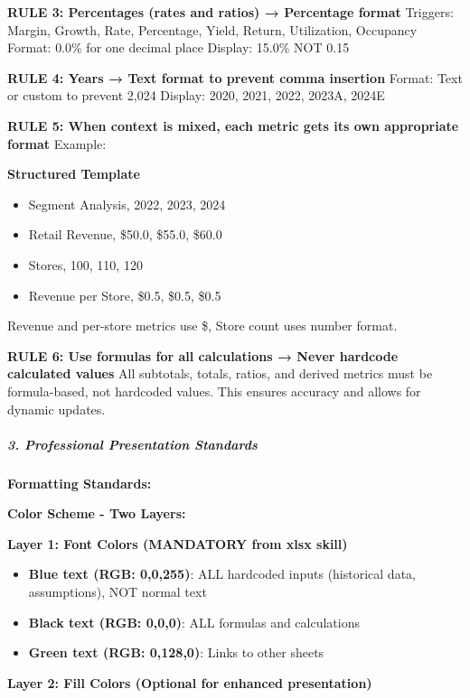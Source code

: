 \documentclass[11pt]{article}
\begin{document}
\textbf{RULE 3: Percentages (rates and ratios) → Percentage format} Triggers: Margin, Growth, Rate, Percentage, Yield, Return, Utilization, Occupancy Format: 0.0\% for one decimal place Display: 15.0\% NOT 0.15


\textbf{RULE 4: Years → Text format to prevent comma insertion} Format: Text or custom to prevent 2,024 Display: 2020, 2021, 2022, 2023A, 2024E


\textbf{RULE 5: When context is mixed, each metric gets its own appropriate format} Example:

\textbf{Structured Template}
\begin{itemize}[leftmargin=*,itemsep=2pt,topsep=2pt]
\item {} Segment Analysis, 2022, 2023, 2024
\item {} Retail Revenue, \$50.0, \$55.0, \$60.0
\item {} Stores, 100, 110, 120
\item {} Revenue per Store, \$0.5, \$0.5, \$0.5
\end{itemize}
Revenue and per-store metrics use \$, Store count uses number format.


\textbf{RULE 6: Use formulas for all calculations → Never hardcode calculated values} All subtotals, totals, ratios, and derived metrics must be formula-based, not hardcoded values. This ensures accuracy and allows for dynamic updates.


\subparagraph{3. Professional Presentation Standards}\mbox{}\par

\textbf{Formatting Standards:}


\textbf{Color Scheme - Two Layers:}


\textbf{Layer 1: Font Colors (MANDATORY from xlsx skill)}

\begin{itemize}[leftmargin=*,itemsep=2pt,topsep=2pt]
\item {} \textbf{Blue text (RGB: 0,0,255)}: ALL hardcoded inputs (historical data, assumptions), NOT normal text
\item {} \textbf{Black text (RGB: 0,0,0)}: ALL formulas and calculations
\item {} \textbf{Green text (RGB: 0,128,0)}: Links to other sheets
\end{itemize}

\textbf{Layer 2: Fill Colors (Optional for enhanced presentation)}
\end{document}
